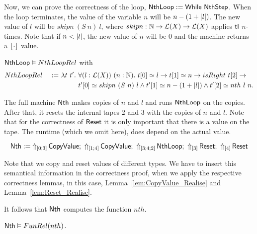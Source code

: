 Now, we can prove the correctness of the loop, $\MS{NthLoop} := \While~\MS{NthStep}$.  When the loop terminates, the value of the variable $n$ will be
$n - (1 + \length{l})$.  The new value of $l$ will be $skipn~(S~n)~l$, where $skipn : \Nat \to \List(X) \to \List(X)$ applies $\tl$ $n$-times.  Note
that if $n < \length{l}$, the new value of $n$ will be $0$ and the machine returns a $\Some\cdot$ value.

\begin{lemma}
  \label{lem:Nth_Loop_Realise}
  $\MS{NthLoop} \Realise NthLoopRel$ with
  \begin{alignat*}{2}
    & NthLoopRel &~:=~& \lambda t~t'.~\forall (l:\List(X))~(n:\Nat).~t[0] \simeq l \rightarrow t[1] \simeq n \rightarrow isRight~t[2] \rightarrow \\
    &            &~  ~& \phantom{\lambda t~t'.}~t'[0] \simeq skipn~(S~n)~l \land t'[1] \simeq n-(1+\length{l}) \land t'[2] \simeq nth~l~n.
  \end{alignat*}
\end{lemma}

The full machine $\MS{Nth}$ makes copies of $n$ and $l$ and runs $\MS{NthLoop}$ on the copies.  After that, it resets the internal tapes $2$ and $3$
with the copies of $n$ and $l$.  Note that for the correctness of $\MS{Reset}$ it is only important that there is a value on the tape.  The runtime
(which we omit here), does depend on the actual value.
\begin{definition}[$\MS{Nth}$][Nth]
  \[
    \MS{Nth} := \LiftTapes{\MS{CopyValue}}{\Vector{0;3}} \Seq
    \LiftTapes{\MS{CopyValue}}{\Vector{1;4}} \Seq
    \LiftTapes{\MS{NthLoop}}{\Vector{3;4;2}} \Seq
    \LiftTapes{\MS{Reset}}{\Vector{3}} \Seq
    \LiftTapes{\MS{Reset}}{\Vector{4}}
  \]
\end{definition}
Note that we copy and reset values of different types.  We have to insert this semantical information in the correctness proof, when we apply the
respective correctness lemmas, in this case, Lemma~\ref{lem:CopyValue_Realise} and Lemma~\ref{lem:Reset_Realise}.

It follows that $\MS{Nth}$ computes the function $nth$.
\begin{lemma}
  \label{lem:Nth_Computes}
  $\MS{Nth} \Realise FunRel(nth)$.
\end{lemma}




